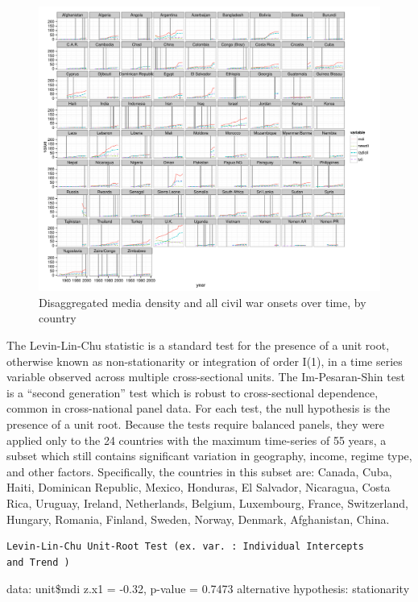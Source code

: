 \documentclass[11pt,article,oneside]{memoir}
\makeatletter
\def\maxwidth{\ifdim\Gin@nat@width>\linewidth\linewidth
\else\Gin@nat@width\fi}
\let\Oldincludegraphics\includegraphics
\renewcommand{\includegraphics}[1]{\Oldincludegraphics[width=\maxwidth]{#1}}
\makeatother
\begin{document}
\begin{figure}[htbp]
\centering
\includegraphics{figure/full_panel_plot.pdf}
\caption{Disaggregated media density and all civil war onsets over time,
by country}
\end{figure}

The Levin-Lin-Chu statistic is a standard test for the presence of a
unit root, otherwise known as non-stationarity or integration of order
I(1), in a time series variable observed across multiple cross-sectional
units. The Im-Pesaran-Shin test is a ``second generation'' test which is
robust to cross-sectional dependence, common in cross-national panel
data. For each test, the null hypothesis is the presence of a unit root.
Because the tests require balanced panels, they were applied only to the
24 countries with the maximum time-series of 55 years, a subset which
still contains significant variation in geography, income, regime type,
and other factors. Specifically, the countries in this subset are:
Canada, Cuba, Haiti, Dominican Republic, Mexico, Honduras, El Salvador,
Nicaragua, Costa Rica, Uruguay, Ireland, Netherlands, Belgium,
Luxembourg, France, Switzerland, Hungary, Romania, Finland, Sweden,
Norway, Denmark, Afghanistan, China.

\begin{verbatim}
Levin-Lin-Chu Unit-Root Test (ex. var. : Individual Intercepts
and Trend )
\end{verbatim}

data: unit\$mdi z.x1 = -0.32, p-value = 0.7473 alternative hypothesis:
stationarity
\end{document}
